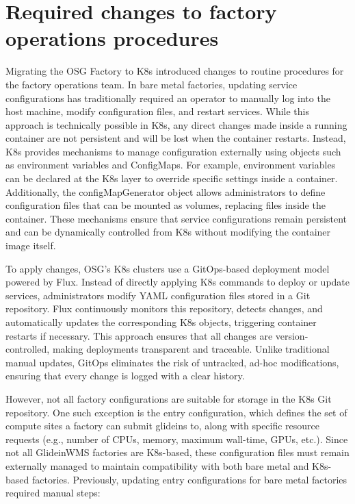 \documentclass{webofc}
\begin{document}
\section{Required changes to factory operations procedures}
\label{procedures}

Migrating the OSG Factory to K8s introduced changes to routine procedures for the factory operations team. In bare metal factories, updating service configurations has traditionally required an operator to manually log into the host machine, modify configuration files, and restart services. While this approach is technically possible in K8s, any direct changes made inside a running container are not persistent and will be lost when the container restarts. Instead, K8s provides mechanisms to manage configuration externally using objects such as environment variables and ConfigMaps. For example, environment variables can be declared at the K8s layer to override specific settings inside a container. Additionally, the configMapGenerator object allows administrators to define configuration files that can be mounted as volumes, replacing files inside the container. These mechanisms ensure that service configurations remain persistent and can be dynamically controlled from K8s without modifying the container image itself.

To apply changes, OSG’s K8s clusters use a GitOps-based deployment model powered by Flux. Instead of directly applying K8s commands to deploy or update services, administrators modify YAML configuration files stored in a Git repository. Flux continuously monitors this repository, detects changes, and automatically updates the corresponding K8s objects, triggering container restarts if necessary. This approach ensures that all changes are version-controlled, making deployments transparent and traceable. Unlike traditional manual updates, GitOps eliminates the risk of untracked, ad-hoc modifications, ensuring that every change is logged with a clear history.

However, not all factory configurations are suitable for storage in the K8s Git repository. One such exception is the entry configuration, which defines the set of compute sites a factory can submit glideins to, along with specific resource requests (e.g., number of CPUs, memory, maximum wall-time, GPUs, etc.). Since not all GlideinWMS factories are K8s-based, these configuration files must remain externally managed to maintain compatibility with both bare metal and K8s-based factories. Previously, updating entry configurations for bare metal factories required manual steps:
\end{document}
